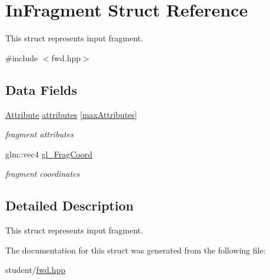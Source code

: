 \hypertarget{structInFragment}{}\section{In\+Fragment Struct Reference}
\label{structInFragment}


This struct represents input fragment.  




{\ttfamily \#include $<$fwd.\+hpp$>$}

\subsection*{Data Fields}
\begin{DoxyCompactItemize}
\item 
\mbox{\label{structInFragment_af9cd9e9a684a1c454d52d7e191564be1}} 
\hyperlink{unionAttribute}{Attribute} \hyperlink{structInFragment_af9cd9e9a684a1c454d52d7e191564be1}{attributes} \mbox{[}\hyperlink{fwd_8hpp_a176b31bcc8f8b93ee7ef0810ea77730b}{max\+Attributes}\mbox{]}
\begin{DoxyCompactList}\small\item\em fragment attributes \end{DoxyCompactList}\item 
\mbox{\label{structInFragment_ae72e0b96e17181ea2cb2ef256e3f0a8f}} 
glm\+::vec4 \hyperlink{structInFragment_ae72e0b96e17181ea2cb2ef256e3f0a8f}{gl\+\_\+\+Frag\+Coord}
\begin{DoxyCompactList}\small\item\em fragment coordinates \end{DoxyCompactList}\end{DoxyCompactItemize}


\subsection{Detailed Description}
This struct represents input fragment. 

The documentation for this struct was generated from the following file\+:\begin{DoxyCompactItemize}
\item 
student/\hyperlink{fwd_8hpp}{fwd.\+hpp}\end{DoxyCompactItemize}
